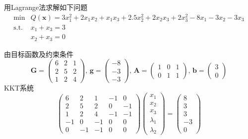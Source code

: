 \begin{example}
    用Lagrange法求解如下问题
    \[
        \begin{array}{rl}
            \operatorname*{min}& Q(\boldsymbol{x})=3x_{1}^{2}+2x_{1}x_{2}+x_{1}x_{3}+2.5x_{2}^{2}+2x_{2}x_{3}+2x_{3}^{2}-8x_{1}-3x_{2}-3x_{3}\\
            \mathrm{s.t.}&x_{1}+x_{3}=3\\
            &x_{2}+x_{3}=0
        \end{array}
    \]
    \begin{solution}
        由目标函数及约束条件
        \[
            \boldsymbol{G}=
                \begin{pmatrix}
                    6&2&1\\2&5&2\\1&2&4
                \end{pmatrix},\,
            \boldsymbol{g}=
                \begin{pmatrix}
                    -8\\-3\\-3
                \end{pmatrix},\,
            \boldsymbol{A}=
                \begin{pmatrix}
                    1&0&1\\0&1&1
                \end{pmatrix},\,
            \boldsymbol{b}=
                \begin{pmatrix}
                    3\\0
                \end{pmatrix}
            \]
            KKT系统
            \[
                \begin{pmatrix}
                    6&2&1&-1&0\\2&5&2&0&-1\\1&2&4&-1&-1\\-1&0&-1&0&0\\0&-1&-1&0&0
                \end{pmatrix}
                \begin{pmatrix}
                    x_1\\x_2\\x_3\\\lambda_1\\\lambda_2
                \end{pmatrix} = 
                \begin{pmatrix}
                    8\\3\\3\\-3\\0

\end{pmatrix}\]
\end{solution}
\end{example}
